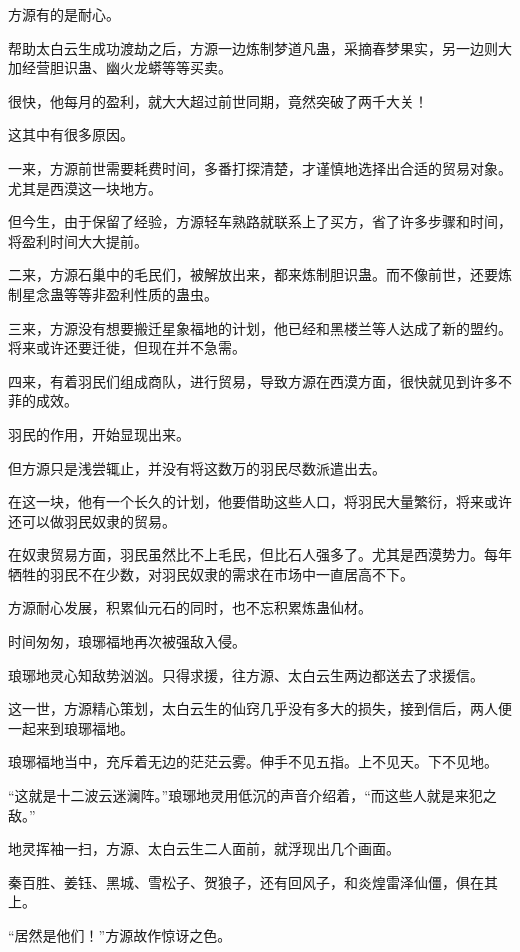 
\begin{this_body}

方源有的是耐心。

帮助太白云生成功渡劫之后，方源一边炼制梦道凡蛊，采摘春梦果实，另一边则大加经营胆识蛊、幽火龙蟒等等买卖。

很快，他每月的盈利，就大大超过前世同期，竟然突破了两千大关！

这其中有很多原因。

一来，方源前世需要耗费时间，多番打探清楚，才谨慎地选择出合适的贸易对象。尤其是西漠这一块地方。

但今生，由于保留了经验，方源轻车熟路就联系上了买方，省了许多步骤和时间，将盈利时间大大提前。

二来，方源石巢中的毛民们，被解放出来，都来炼制胆识蛊。而不像前世，还要炼制星念蛊等等非盈利性质的蛊虫。

三来，方源没有想要搬迁星象福地的计划，他已经和黑楼兰等人达成了新的盟约。将来或许还要迁徙，但现在并不急需。

四来，有着羽民们组成商队，进行贸易，导致方源在西漠方面，很快就见到许多不菲的成效。

羽民的作用，开始显现出来。

但方源只是浅尝辄止，并没有将这数万的羽民尽数派遣出去。

在这一块，他有一个长久的计划，他要借助这些人口，将羽民大量繁衍，将来或许还可以做羽民奴隶的贸易。

在奴隶贸易方面，羽民虽然比不上毛民，但比石人强多了。尤其是西漠势力。每年牺牲的羽民不在少数，对羽民奴隶的需求在市场中一直居高不下。

方源耐心发展，积累仙元石的同时，也不忘积累炼蛊仙材。

时间匆匆，琅琊福地再次被强敌入侵。

琅琊地灵心知敌势汹汹。只得求援，往方源、太白云生两边都送去了求援信。

这一世，方源精心策划，太白云生的仙窍几乎没有多大的损失，接到信后，两人便一起来到琅琊福地。

琅琊福地当中，充斥着无边的茫茫云雾。伸手不见五指。上不见天。下不见地。

“这就是十二波云迷澜阵。”琅琊地灵用低沉的声音介绍着，“而这些人就是来犯之敌。”

地灵挥袖一扫，方源、太白云生二人面前，就浮现出几个画面。

秦百胜、姜钰、黑城、雪松子、贺狼子，还有回风子，和炎煌雷泽仙僵，俱在其上。

“居然是他们！”方源故作惊讶之色。


\end{this_body}
